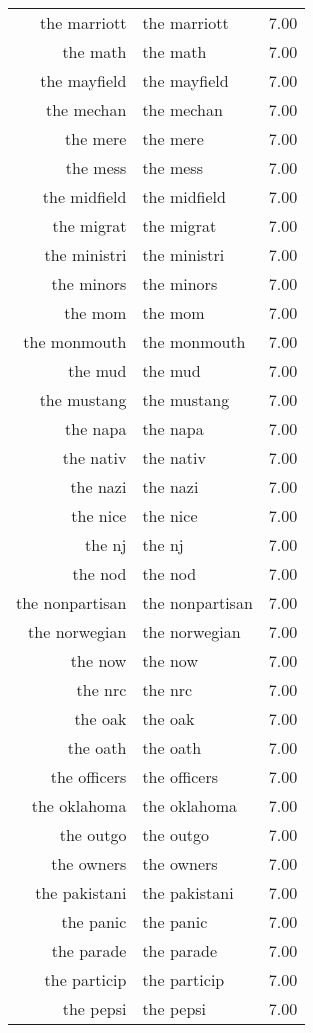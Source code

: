 \begin{table}[ht]
\begin{tabular}{rlr}
  the marriott & the marriott & 7.00 \\ 
  the math & the math & 7.00 \\ 
  the mayfield & the mayfield & 7.00 \\ 
  the mechan & the mechan & 7.00 \\ 
  the mere & the mere & 7.00 \\ 
  the mess & the mess & 7.00 \\ 
  the midfield & the midfield & 7.00 \\ 
  the migrat & the migrat & 7.00 \\ 
  the ministri & the ministri & 7.00 \\ 
  the minors & the minors & 7.00 \\ 
  the mom & the mom & 7.00 \\ 
  the monmouth & the monmouth & 7.00 \\ 
  the mud & the mud & 7.00 \\ 
  the mustang & the mustang & 7.00 \\ 
  the napa & the napa & 7.00 \\ 
  the nativ & the nativ & 7.00 \\ 
  the nazi & the nazi & 7.00 \\ 
  the nice & the nice & 7.00 \\ 
  the nj & the nj & 7.00 \\ 
  the nod & the nod & 7.00 \\ 
  the nonpartisan & the nonpartisan & 7.00 \\ 
  the norwegian & the norwegian & 7.00 \\ 
  the now & the now & 7.00 \\ 
  the nrc & the nrc & 7.00 \\ 
  the oak & the oak & 7.00 \\ 
  the oath & the oath & 7.00 \\ 
  the officers & the officers & 7.00 \\ 
  the oklahoma & the oklahoma & 7.00 \\ 
  the outgo & the outgo & 7.00 \\ 
  the owners & the owners & 7.00 \\ 
  the pakistani & the pakistani & 7.00 \\ 
  the panic & the panic & 7.00 \\ 
  the parade & the parade & 7.00 \\ 
  the particip & the particip & 7.00 \\ 
  the pepsi & the pepsi & 7.00 \\ 

\end{tabular}
\end{table}
